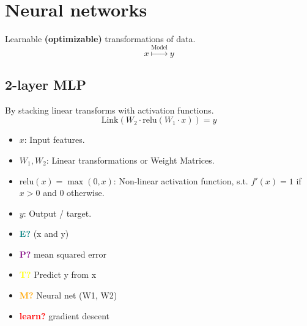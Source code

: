 \section{Neural networks}
\begin{definition}
    Learnable \textbf{(optimizable)} transformations of data.
    \begin{equation}
        x \overset{\text{Model}}{\mapsto} y
    \end{equation}
\end{definition}

\subsection{2-layer MLP}
\begin{definition} By stacking linear transforms with activation functions.
    \begin{equation}
        \text{Link}(W_2 \cdot \text{relu}(W_1 \cdot x)) = y
    \end{equation}
    \begin{itemize}
        \item $x$: Input features.
        \item $W_1, W_2$: Linear transformations or Weight Matrices.
        \item $\text{relu}(x) = \max(0,x)$: Non-linear activation function, s.t. $f'(x) = 1$ if $x > 0$ and $0$ otherwise.
        \item $y$: Output / target. 
    \end{itemize}
    \vspace{1em}

    \begin{itemize}
        \item \textcolor{teal}{\textbf{E?}} (x and y)
        \item \textcolor{purple}{\textbf{P?}} mean squared error
        \item \textcolor{yellow}{\textbf{T?}} Predict y from x
        \item \textcolor{orange}{\textbf{M?}} Neural net (W1, W2)
        \item \textcolor{red}{\textbf{learn?}} gradient descent
    \end{itemize}
\end{definition}

